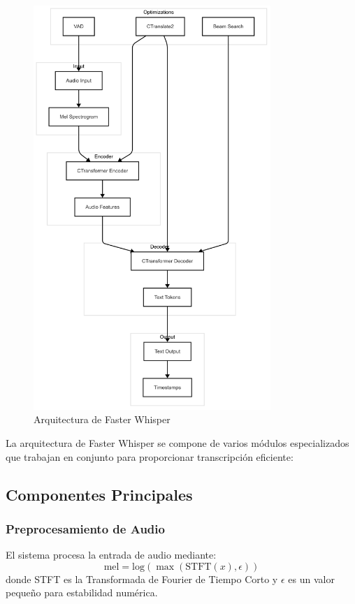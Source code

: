 \begin{figure}[H]
	\caption{Arquitectura de Faster Whisper}
	\label{fig:whisper}
	\includegraphics[width=0.8\textwidth]{figuras/whisper.png}
\end{figure}

La arquitectura de Faster Whisper se compone de varios módulos especializados que trabajan en conjunto para proporcionar transcripción eficiente:

\subsection{Componentes Principales}
\label{subsec:main-components}

\subsubsection{Preprocesamiento de Audio}
El sistema procesa la entrada de audio mediante:
\begin{equation}
	\text{mel} = \text{log}(\max(\text{STFT}(x), \epsilon))
\end{equation}
donde STFT es la Transformada de Fourier de Tiempo Corto y $\epsilon$ es un valor pequeño para estabilidad numérica.

